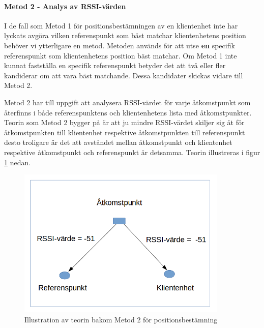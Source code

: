 \documentclass[swedish, a4paper,12pt]{article}
\begin{document}

\paragraph{Metod 2 - Analys av RSSI-värden}
\leavevmode\newline
I de fall som Metod 1 för positionsbestämningen av en klientenhet inte har lyckats avgöra vilken referenspunkt som bäst matchar klientenhetens position behöver vi ytterligare en metod. Metoden används för att utse \textbf{en} specifik referenspunkt som klientenhetens position bäst matchar. Om Metod 1 inte kunnat fastställa en specifik referenspunkt betyder det att två eller fler kandiderar om att vara bäst matchande. Dessa kandidater skickas vidare till Metod 2.

Metod 2 har till uppgift att analysera RSSI-värdet för varje åtkomstpunkt som återfinns i både referenspunktens och klientenhetens lista med åtkomstpunkter.
Teorin som Metod 2 bygger på är att ju mindre RSSI-värdet skiljer sig åt för åtkomstpunkten till klientenhet respektive åtkomstpunkten till referenspunkt desto troligare är det att avståndet mellan åtkomstpunkt och klientenhet respektive åtkomstpunkt och referenspunkt är detsamma. Teorin illustreras i figur \ref{fig:TEO2} nedan.

\begin{figure}[H]
  \centering
  \includegraphics[width=10cm]{media/TeoriMetod2.png}
  \caption{Illustration av teorin bakom Metod 2 för positionsbestämning}
  \label{fig:TEO2}
\end{figure}
\end{document}
